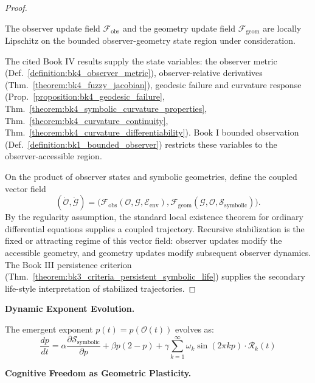 \begin{scholium}
\begin{proof}
\label{proof:bk4_observer_geometry_coevolution}
\leavevmode

\begin{assumption}
The observer update field $\mathcal F_{\mathrm{obs}}$ and the geometry update
field $\mathcal F_{\mathrm{geom}}$ are locally Lipschitz on the bounded
observer-geometry state region under consideration.
\end{assumption}

The cited Book IV results supply the state variables: the observer metric
(Def.~\ref{definition:bk4_observer_metric}), observer-relative derivatives
(Thm.~\ref{theorem:bk4_fuzzy_jacobian}), geodesic failure and curvature response
(Prop.~\ref{proposition:bk4_geodesic_failure},
Thm.~\ref{theorem:bk4_symbolic_curvature_properties},
Thm.~\ref{theorem:bk4_curvature_continuity},
Thm.~\ref{theorem:bk4_curvature_differentiability}). Book I bounded observation
(Def.~\ref{definition:bk1_bounded_observer}) restricts these variables to the
observer-accessible region.

On the product of observer states and symbolic geometries, define the coupled
vector field
\[
(\dot{\mathcal O},\dot{\mathcal G})
=
\bigl(
\mathcal F_{\mathrm{obs}}(\mathcal O,\mathcal G,\mathcal E_{\mathrm{env}}),
\mathcal F_{\mathrm{geom}}(\mathcal G,\mathcal O,\mathcal S_{\mathrm{symbolic}})
\bigr).
\]
By the regularity assumption, the standard local existence theorem for ordinary
differential equations supplies a coupled trajectory. Recursive stabilization
is the fixed or attracting regime of this vector field: observer updates modify
the accessible geometry, and geometry updates modify subsequent observer
dynamics. The Book III persistence criterion
(Thm.~\ref{theorem:bk3_criteria_persistent_symbolic_life}) supplies the
secondary life-style interpretation of stabilized trajectories.
\end{proof}

\vspace{1em}
\noindent\textbf{Dynamic Exponent Evolution.}

The emergent exponent $p(t) = p(\mathcal{O}(t))$ evolves as:
\[
\frac{dp}{dt} = \alpha \frac{\partial \mathcal{S}_{\text{symbolic}}}{\partial p} + \beta p(2-p) + \gamma \sum_{k=1}^{\infty} \omega_k \sin(2\pi k p) \cdot \mathcal{R}_k(t)
\]

\vspace{1em}
\noindent\textbf{Cognitive Freedom as Geometric Plasticity.}


\end{scholium}
